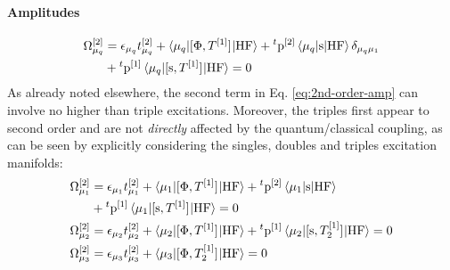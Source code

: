 \paragraph*{Amplitudes}
\begin{equation}\label{eq:2nd-order-amp}
  \begin{aligned}
  \Omega_{\mu_q}^{[2]} &= \epsilon_{\mu_q}t_{\mu_q}^{[2]}
  + \braket{\mu_q | [ \Phi, T^{[1]} ]^{} | \mathrm{HF}}
  + {}^t\mathrm{p}^{[2]}\braket{\mu_q | \mathrm{s} | \mathrm{HF}}\delta_{\mu_q\mu_1} \\
  &+ {}^t\mathrm{p}^{[1]}\braket{\mu_q | [ \mathrm{s}, T^{[1]} ]^{} |
  \mathrm{HF}}
  = 0
  \end{aligned}
\end{equation}
As already noted elsewhere,\autocite{Koch1997-nm, Helgaker2000-tz}
the second term in Eq. \eqref{eq:2nd-order-amp} can involve no higher
than triple excitations.
Moreover, the triples first appear to second order and are not
\emph{directly} affected by the quantum/classical coupling, as can be
seen by explicitly considering the singles, doubles and triples
excitation manifolds:
\begin{subequations}
  \begin{align}
  \Omega_{\mu_1}^{[2]} &= \epsilon_{\mu_1}t_{\mu_1}^{[2]}
  + \braket{\mu_1 | [ \Phi, T^{[1]} ]^{} | \mathrm{HF}}
  + {}^t\mathrm{p}^{[2]}\braket{\mu_1 | \mathrm{s} | \mathrm{HF}} \nonumber \\
  &+ {}^t\mathrm{p}^{[1]}\braket{\mu_1 | [ \mathrm{s}, T^{[1]} ]^{} |
  \mathrm{HF}}
  = 0 \\
  \Omega_{\mu_2}^{[2]} &= \epsilon_{\mu_2}t_{\mu_2}^{[2]}
  + \braket{\mu_2 | [ \Phi, T^{[1]} ]^{} | \mathrm{HF}}
  + {}^t\mathrm{p}^{[1]}\braket{\mu_2 | [ \mathrm{s}, T_2^{[1]} ]^{} |
  \mathrm{HF}}
  = 0 \\
  \Omega_{\mu_3}^{[2]} &= \epsilon_{\mu_3}t_{\mu_3}^{[2]}
  + \braket{\mu_3 | [ \Phi, T_2^{[1]} ]^{} | \mathrm{HF}}
  = 0
  \end{align}
\end{subequations}

